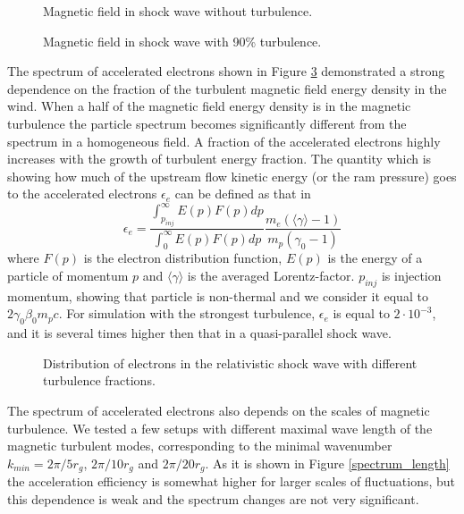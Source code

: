 \documentclass[a4paper]{jpconf}
\begin{document}
\begin{figure}[h!]
		\centering
		\caption{Magnetic field in shock wave without turbulence.}
		\label{regularB}
\end{figure}
\begin{figure}[h!]
		\centering
		\caption{Magnetic field in shock wave with 90\% turbulence.}
		\label{turbulentB}
\end{figure}
The spectrum of accelerated electrons  shown in Figure \ref{spectrum}  demonstrated a strong dependence on the fraction of the turbulent magnetic 
field energy density in the wind. 
When a half of the magnetic field energy density is in the magnetic turbulence the particle spectrum becomes significantly 
different from the spectrum in a homogeneous field. A fraction of the accelerated electrons highly increases with the growth of turbulent energy fraction. 
The quantity which is showing how much of the upstream flow kinetic energy (or the ram pressure) goes to the accelerated electrons 
$\epsilon_e$ can be defined as that in \cite{Crumley2019}
\begin{equation}
\epsilon_e = \frac{\int_{p_{inj}}^{\infty}E(p)F(p)dp}{\int_{0}^{\infty}E(p)F(p)dp }\frac{m_e(\langle \gamma \rangle - 1)}{m_p (\gamma_0 - 1)}
\end{equation}
where $F(p)$ is the electron distribution function, $E(p)$ is the energy of a particle of momentum $p$ and $\langle \gamma \rangle$ is the averaged Lorentz-factor. 
$p_{inj}$ is injection momentum, showing that particle is non-thermal and we consider it equal to $2 \gamma_0 \beta_0 m_p c$. For simulation with the strongest turbulence, $\epsilon_e$ is equal to $2\cdot10^{-3}$, and it is several times higher then that in a quasi-parallel shock wave.
\begin{figure}[h!]
	\centering
	\caption{Distribution of electrons in the relativistic shock wave with different turbulence fractions.}
	\label{spectrum}
\end{figure} 

The spectrum of accelerated electrons also depends on the scales of magnetic turbulence. We tested a few setups with different maximal wave length of the magnetic turbulent modes, corresponding to the minimal wavenumber $k_{min} = 2 \pi / 5 r_g$, $2 \pi / 10 r_g$ and $ 2 \pi /20 r_g$. As it is shown in Figure \ref{spectrum_length} the acceleration efficiency is somewhat higher for larger scales of fluctuations, but this dependence is weak and the spectrum changes are not very significant.
\end{document}

